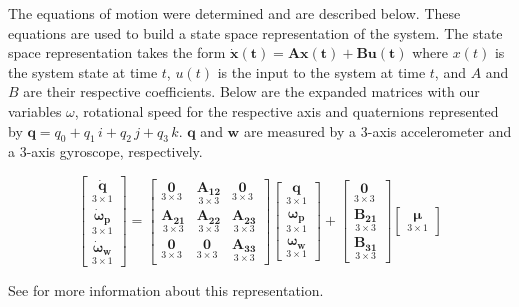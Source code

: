 \documentclass{article}
\begin{document}
\noindent The equations of motion were determined and are described below.
These equations are used to build a state space representation
of the system. The state space representation takes the form 
$\boldsymbol{\dot{x}(t)} = \boldsymbol{A}\boldsymbol{x(t)} + 
\boldsymbol{B}\boldsymbol{u(t)}$ where $x(t)$ is the system state 
at time $t$, $u(t)$ is the input to the system at time $t$, and $A$ 
and $B$ are their respective coefficients. Below are the expanded 
matrices with our variables $\omega$, rotational speed for the 
respective axis and quaternions represented by $\boldsymbol{q} = q_0 + q_1\,i 
+ q_2\,j + q_3\,k$. $\boldsymbol{q}$ and $\boldsymbol{w}$ are measured 
by a 3-axis accelerometer and a 3-axis gyroscope, respectively.

\[
\begin{bmatrix}
\underset{3\times 1}{\boldsymbol{\dot{q}}} \\
\underset{3\times 1}{\boldsymbol{\dot{\omega}_p}} \\
\underset{3\times 1}{\boldsymbol{\dot{\omega}_w}}
\end{bmatrix}
=
\begin{bmatrix}
\underset{3\times 3}{\boldsymbol{0}} & \underset{3\times 3}{\boldsymbol{A_{12}}} & \underset{3\times 3}{\boldsymbol{0}} \\
\underset{3\times 3}{\boldsymbol{A_{21}}} & \underset{3\times 3}{\boldsymbol{A_{22}}} & \underset{3\times 3}{\boldsymbol{A_{23}}} \\
\underset{3\times 3}{\boldsymbol{0}} & \underset{3\times 3}{\boldsymbol{0}} & \underset{3\times 3}{\boldsymbol{A_{33}}}
\end{bmatrix}
\begin{bmatrix}
\underset{3\times 1}{\boldsymbol{q}} \\
\underset{3\times 1}{\boldsymbol{\omega_p}} \\
\underset{3\times 1}{\boldsymbol{\omega_w}}
\end{bmatrix}
+
\begin{bmatrix}
\underset{3\times 3}{\boldsymbol{0}} \\
\underset{3\times 3}{\boldsymbol{B_{21}}} \\
\underset{3\times 3}{\boldsymbol{B_{31}}}
\end{bmatrix}
\begin{bmatrix}
\underset{3\times 1}{\boldsymbol{\mu}}
\end{bmatrix}
\]

\noindent See \cite{mitstatespace} for more information about this representation.
\end{document}
